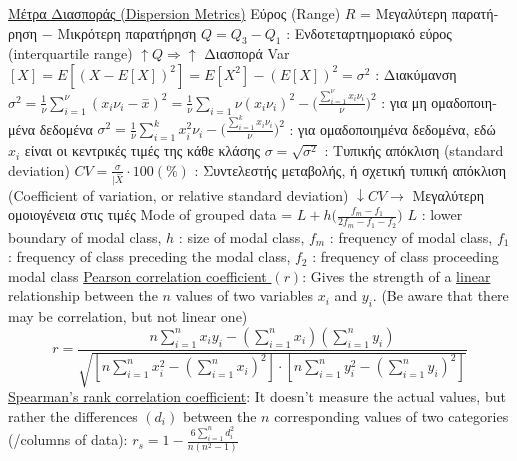 \documentclass[12pt]{article}
\begin{document}
\begin{flushleft}
	\uline{\textgreek{Μέτρα Διασποράς} (Dispersion Metrics)} \linebreak 
	\textbullet \quad \textgreek{Εύρος} (Range) $R$ = \textgreek{Μεγαλύτερη παρατήρηση} $-$ \textgreek{Μικρότερη παρατήρηση} \linebreak 
	\textbullet \quad $Q= Q_3 -Q_1$  :  \textgreek{Ενδοτεταρτημοριακό εύρος} (interquartile range) $\uparrow Q \Rightarrow \uparrow $ \textgreek{Διασπορά} \linebreak 
	\textbullet \quad Var$[X] = E\left[ (X - E[X] ) ^2 \right] = E\left[ X^2 \right] - (E\left[ X \right] )^2 = \sigma^2 $  :  \textgreek{Διακύμανση} \linebreak 
	$\displaystyle \sigma^2 = \frac{1}{\nu} \sum \limits_{i=1}^{\nu} (x_i\nu_i - \overset{-}{x} )^2 = \frac{1}{\nu} \sum \limits_{i=1}{\nu} (x_i \nu_i )^2 - \big( \frac{\sum \limits_{i=1}^{\nu} x_i \nu_i}{\nu} \big)^2 $  :  \textgreek{για μη ομαδοποιημένα δεδομένα} \linebreak 
	$\displaystyle \sigma^2 = \frac{1}{\nu} \sum \limits_{i=1}^k x_i^2 \nu_i - \big( \frac{\sum \limits_{i=1}^k x_i \nu_i}{\nu} \big)^2 $  :  \textgreek{για ομαδοποιημένα δεδομένα, εδώ} $x_i$ \textgreek{είναι οι κεντρικές τιμές της κάθε κλάσης} \linebreak 
	\textbullet \quad $\sigma = \sqrt{\sigma^2} $ \textgreek{: Τυπικής απόκλιση} (standard deviation) \linebreak 
	\textbullet \quad $\displaystyle CV = \frac{\sigma}{|\overset{-}{X}} \cdot 100(\%) $  :  \textgreek{Συντελεστής μεταβολής, ή σχετική τυπική απόκλιση} (Coefficient of variation, or relative standard deviation) \linebreak 
	$\downarrow CV \rightarrow $ \textgreek{Μεγαλύτερη ομοιογένεια στις τιμές} \linebreak 
	\textbullet \quad Mode of grouped data = $\displaystyle L + h \big( \frac{f_m-f_1}{2f_m-f_1-f_2} \big) $ \linebreak 
	$L$  :  lower boundary of modal class, $h$  :  size of modal class, $f_m$  :  frequency of modal class, $f_1$  :  frequency of class preceding the modal class, $f_2$  :  frequency of class proceeding modal class \linebreak 
	\textbullet \quad \uline{Pearson correlation coefficient $(r)$}: Gives the strength of a \uline{linear} relationship between the $n$ values of two variables $x_i$ and $y_i$. \linebreak  
	(Be aware that there may be correlation, but not linear one) \linebreak 
	$$ r= \frac{n\sum \limits_{i=1}^n x_i y_i - \left( \sum \limits_{i=1}^n x_i \right) \left( \sum \limits_{i=1}^n y_i \right)}{\sqrt{\left[ n\sum \limits_{i=1}^n x_i^2 - \left( \sum \limits_{i=1}^n x_i \right)^2 \right] \cdot \left[ n \sum \limits_{i=1}^n y_i^2 - \left( \sum \limits_{i=1}^n y_i \right)^2 \right]}} $$ 
	\textbullet \quad \uline{Spearman's rank correlation coefficient}: It doesn't measure the actual values, but rather the differences $(d_i)$ between the $n$ corresponding values of two categories (/columns of data): \linebreak 
	$\displaystyle r_s = 1 - \frac{6 \sum \limits_{i=1}^n d_i^2}{n(n^2-1)} $ \linebreak 
	

\end{flushleft}
\end{document}
